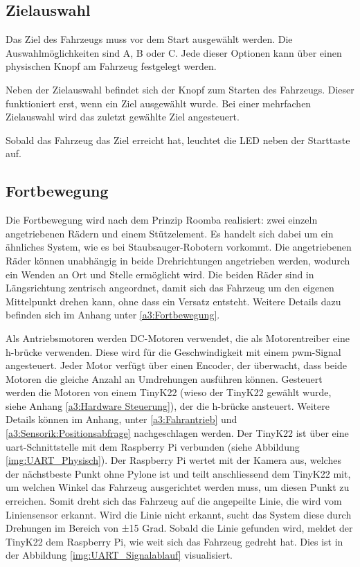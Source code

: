 \documentclass[../main.tex]{subfiles}
\begin{document}
\newpage
\subsection{Zielauswahl}

Das Ziel des Fahrzeugs muss vor dem Start ausgewählt werden. Die Auswahlmöglichkeiten sind A, B oder C. Jede dieser Optionen kann über einen physischen Knopf am Fahrzeug festgelegt werden.

Neben der Zielauswahl befindet sich der Knopf zum Starten des Fahrzeugs. Dieser funktioniert erst, wenn ein Ziel ausgewählt wurde. Bei einer mehrfachen Zielauswahl wird das zuletzt gewählte Ziel angesteuert.

Sobald das Fahrzeug das Ziel erreicht hat, leuchtet die LED neben der Starttaste auf.

\subsection{Fortbewegung} 

Die Fortbewegung wird nach dem Prinzip Roomba realisiert: zwei einzeln angetriebenen Rädern und einem Stützelement. Es handelt sich dabei um ein ähnliches System, wie es bei Staubsauger-Robotern vorkommt. Die angetriebenen Räder können unabhängig in beide Drehrichtungen angetrieben werden, wodurch ein Wenden an Ort und Stelle ermöglicht wird. Die beiden Räder sind in Längsrichtung zentrisch angeordnet, damit sich das Fahrzeug um den eigenen Mittelpunkt drehen kann, ohne dass ein Versatz entsteht. Weitere Details dazu befinden sich im Anhang unter \ref{a3:Fortbewegung}.

Als Antriebsmotoren werden DC-Motoren verwendet, die als Motorentreiber eine \gls{h-brücke} verwenden. Diese wird für die Geschwindigkeit mit einem \gls{pwm}-Signal angesteuert. Jeder Motor verfügt über einen Encoder, der überwacht, dass beide Motoren die gleiche Anzahl an Umdrehungen ausführen können. Gesteuert werden die Motoren von einem TinyK22 (wieso der TinyK22 gewählt wurde, siehe Anhang \ref{a3:Hardware Steuerung}), der die \gls{h-brücke} ansteuert. Weitere Details können im Anhang, unter \ref{a3:Fahrantrieb} und \ref{a3:Sensorik:Positionsabfrage} nachgeschlagen werden.
\newpage
Der TinyK22 ist über eine \Gls{uart}-Schnittstelle mit dem Raspberry Pi verbunden (siehe Abbildung \ref{img:UART_Physisch}). Der Raspberry Pi wertet mit der Kamera aus, welches der nächstbeste Punkt ohne Pylone ist und teilt anschliessend dem TinyK22 mit, um welchen Winkel das Fahrzeug ausgerichtet werden muss, um diesen Punkt zu erreichen. Somit dreht sich das Fahrzeug auf die angepeilte Linie, die wird vom Liniensensor erkannt. Wird die Linie nicht erkannt, sucht das System diese durch Drehungen im Bereich von ±15 Grad. Sobald die Linie gefunden wird, meldet der TinyK22 dem Raspberry Pi, wie weit sich das Fahrzeug gedreht hat. Dies ist in der Abbildung \ref{img:UART_Signalablauf} visualisiert.
\end{document}
